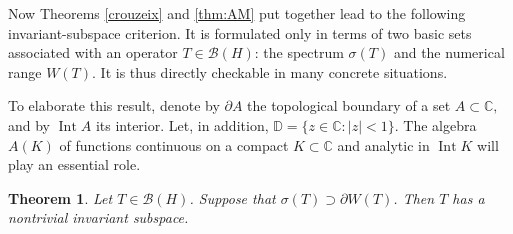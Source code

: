 \documentclass[11pt]{amsart}
\numberwithin{equation}{section}
\newtheorem{theorem}{Theorem}[section]
\theoremstyle{definition}
\theoremstyle{remark}
\DeclareMathOperator{\Int}{Int}
\newcommand{\CC}{\mathbb{C}}
\newcommand{\TT}{\mathbb{T}}
\newcommand{\DD}{\mathbb{D}}
\newcommand{\BH}{\mathcal B(H)}
\begin{document}
Now Theorems \ref{crouzeix} and \ref{thm:AM} put together lead to the following invariant-subspace criterion. It is formulated only in terms of two basic sets associated with an operator $T\in\BH$: the spectrum $\sigma(T)$ and the numerical range $W(T)$. It is thus directly checkable in many concrete situations. 

To elaborate this result,
 denote by $\partial A$ the topological boundary of a set $A\subset\CC,$ and by $\Int A$ its interior. Let, in addition, $\DD=\{z\in\CC: |z|<1\}.$ 
The algebra $A(K)$ of functions continuous on a compact $K\subset \mathbb C$ and analytic in $\operatorname{Int}K$ will play an essential role.

\begin{theorem}\label{t1}
Let $T\in\BH$. Suppose that $\sigma(T)\supset\partial W(T)$. Then $T$ has a nontrivial invariant subspace.
\end{theorem}
\end{document}
